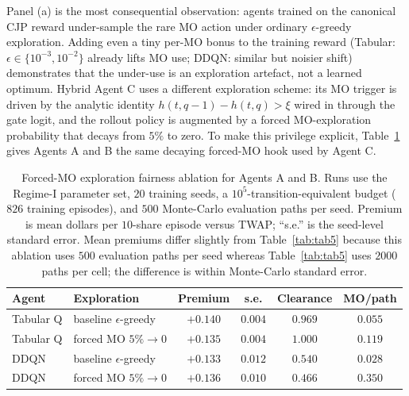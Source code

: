 \documentclass[]{interact}
\theoremstyle{plain}
\theoremstyle{definition}
\theoremstyle{remark}
\newcommand{\1}[1]{\mathbf{1}_{\{#1\}}}
\begin{document}
Panel (a) is the most consequential observation: agents trained on the canonical CJP reward under-sample the rare MO action under ordinary $\epsilon$-greedy exploration. Adding even a tiny per-MO bonus to the training reward (Tabular: $\epsilon \in \{10^{-3}, 10^{-2}\}$ already lifts MO use; DDQN: similar but noisier shift) demonstrates that the under-use is an exploration artefact, not a learned optimum. Hybrid Agent C uses a different exploration scheme: its MO trigger is driven by the analytic identity $h(t, q-1) - h(t, q) > \xi$ wired in through the gate logit, and the rollout policy is augmented by a forced MO-exploration probability that decays from $5\%$ to zero. To make this privilege explicit, Table~\ref{tab:forced-mo-ablation} gives Agents A and B the same decaying forced-MO hook used by Agent C.

\begin{table}[t]
\centering
\caption{Forced-MO exploration fairness ablation for Agents A and B. Runs use the Regime-I parameter set, $20$ training seeds, a $10^5$-transition-equivalent budget ($826$ training episodes), and $500$ Monte-Carlo evaluation paths per seed. Premium is mean dollars per $10$-share episode versus TWAP; ``s.e.'' is the seed-level standard error. Mean premiums differ slightly from Table~\ref{tab:tab5} because this ablation uses $500$ evaluation paths per seed whereas Table~\ref{tab:tab5} uses $2000$ paths per cell; the difference is within Monte-Carlo standard error.}
\label{tab:forced-mo-ablation}
\small
\begin{tabular}{@{}llcccc@{}}
\toprule
Agent & Exploration & Premium & s.e. & Clearance & MO/path \\
\midrule
Tabular Q & baseline $\epsilon$-greedy & $+0.140$ & $0.004$ & $0.969$ & $0.055$ \\
Tabular Q & forced MO $5\%\to0$ & $+0.135$ & $0.004$ & $1.000$ & $0.119$ \\
DDQN & baseline $\epsilon$-greedy & $+0.133$ & $0.012$ & $0.540$ & $0.028$ \\
DDQN & forced MO $5\%\to0$ & $+0.136$ & $0.010$ & $0.466$ & $0.350$ \\
\bottomrule
\end{tabular}
\end{table}
\end{document}
